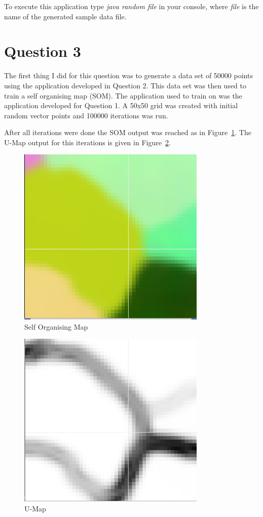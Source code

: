 \documentclass[a4paper,11pt,titlepage]{article}
\begin{document}
To execute this application type \emph{java random file} in your console, where \emph{file} is the name of the generated sample data file.

\section{Question 3}
The first thing I did for this question was to generate a data set of 50000 points using the application developed in Question 2. This data set was then used to train a self organising map (SOM). The application used to train on was the application developed for Question 1. A 50x50 grid was created with initial random vector points and 100000 iterations was run.

After all iterations were done the SOM output was reached as in Figure~\ref{Figure:som}. The U-Map output for this iterations is given in Figure~\ref{Figure:umap}.


\begin{figure}[htbp]
   \centering
   \includegraphics[width=9cm]{som.png}
   \caption{Self Organising Map}
   \label{Figure:som}
\end{figure}

\begin{figure}[htbp]
   \centering
   \includegraphics[width=9cm]{umap.png}
   \caption{U-Map}
   \label{Figure:umap}
\end{figure}
\end{document}
